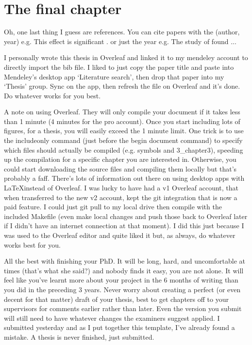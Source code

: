 \chapter[The final chapter]{The final chapter}
\label{ch:conclusions_futurework}

Oh, one last thing I guess are references. You can cite papers with the (author, year) e.g. This effect is significant \citep{Davies2015}. or just the year e.g. The study of \citet{Mound2019RegionalVariations} found ...

I personally wrote this thesis in Overleaf and linked it to my mendeley account to directly import the bib file. I liked to just copy the paper title and paste into Mendeley's desktop app `Literature search', then drop that paper into my `Thesis' group. Sync on the app, then refresh the file on Overleaf and it's done. Do whatever works for you best.

A note on using Overleaf. They will only compile your document if it takes less than 1 minute (4 minutes for the pro account). Once you start including lots of figures, for a thesis, you will easily exceed the 1 minute limit. One trick is to use the includeonly command (just before the begin document command) to specify which files should actually be compiled (e.g. symbols and 3_chapter3), speeding up the compilation for a specific chapter you are interested in. Otherwise, you could start downloading the source files and compiling them locally but that's probably a faff. There's lots of information out there on using desktop apps with \LaTeX instead of Overleaf. I was lucky to have had a v1 Overleaf account, that when transferred to the new v2 account, kept the git integration that is now a paid feature. I could just git pull to my local drive then compile with the included Makefile (even make local changes and push those back to Overleaf later if I didn't have an internet connection at that moment). I did this just because I was used to the Overleaf editor and quite liked it but, as always, do whatever works best for you.

All the best with finishing your PhD. It will be long, hard, and uncomfortable at times (that's what she said?) and nobody finds it easy, you are not alone. It will feel like you've learnt more about your project in the 6 months of writing than you did in the preceding 3 years. Never worry about creating a perfect (or even decent for that matter) draft of your thesis, best to get chapters off to your supervisors for comments earlier rather than later. Even the version you submit will still need to have whatever changes the examiners suggest applied. I submitted yesterday and as I put together this template, I've already found a mistake. A thesis is never finished, just submitted.
